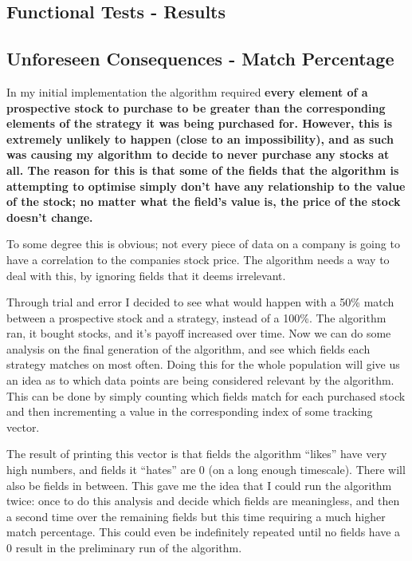 \subsection{Functional Tests - Results}

\subsection{Unforeseen Consequences - Match Percentage} \label{testingConsequences}
In my initial implementation the algorithm required \bf every \rm element of a prospective stock to purchase to be greater than the corresponding elements of the strategy it was being purchased for. However, this is extremely unlikely to happen (close to an impossibility), and as such was causing my algorithm to decide to never purchase any stocks at all. The reason for this is that some of the fields that the algorithm is attempting to optimise simply don't have any relationship to the value of the stock; no matter what the field's value is, the price of the stock doesn't change. \newline

To some degree this is obvious; not every piece of data on a company is going to have a correlation to the companies stock price. The algorithm needs a way to deal with this, by ignoring fields that it deems irrelevant. \newline

Through trial and error I decided to see what would happen with a 50\% match between a prospective stock and a strategy, instead of a 100\%. The algorithm ran, it bought stocks, and it's payoff increased over time. Now we can do some analysis on the final generation of the algorithm, and see which fields each strategy matches on most often. Doing this for the whole population will give us an idea as to which data points are being considered relevant by the algorithm. This can be done by simply counting which fields match for each purchased stock and then incrementing a value in the corresponding index of some tracking vector. \newline

The result of printing this vector is that fields the algorithm ``likes'' have very high numbers, and fields it ``hates'' are 0 (on a long enough timescale). There will also be fields in between. This gave me the idea that I could run the algorithm twice: once to do this analysis and decide which fields are meaningless, and then a second time over the remaining fields but this time requiring a much higher match percentage. This could even be indefinitely repeated until no fields have a 0 result in the preliminary run of the algorithm. \newline

